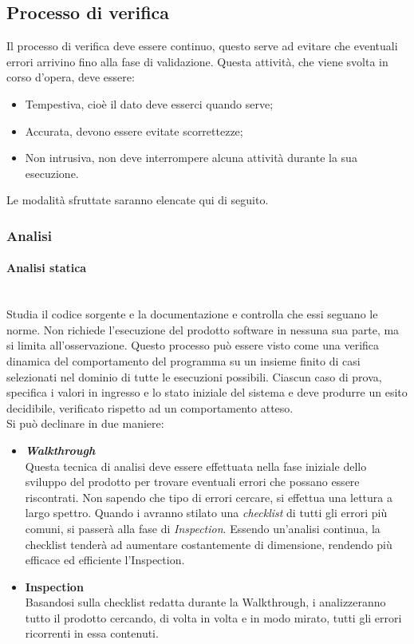\subsection{Processo di verifica}
Il processo di verifica deve essere continuo, questo serve ad evitare che eventuali errori arrivino fino alla fase di validazione.
Questa attività, che viene svolta in corso d'opera, deve essere:
\begin{itemize}
	\item Tempestiva, cioè il dato deve esserci quando serve;
	\item Accurata, devono essere evitate scorrettezze;
	\item Non intrusiva, non deve interrompere alcuna attività durante la sua esecuzione.
\end{itemize}
Le modalità sfruttate saranno elencate qui di seguito.
	\subsubsection{Analisi}
	\paragraph{Analisi statica}
	~\\Studia il codice sorgente e la documentazione e controlla che essi seguano le norme. Non richiede l'esecuzione del prodotto software in nessuna sua parte, ma si limita all'osservazione. Questo processo può essere visto come una verifica dinamica del comportamento del programma su un insieme finito di casi selezionati nel dominio di tutte le esecuzioni possibili. Ciascun caso di prova, specifica i valori in ingresso e lo stato iniziale del sistema e deve produrre un esito decidibile, verificato rispetto ad un comportamento atteso. 
	\\Si può declinare in due maniere:
	\begin{itemize}
		\item \textbf{\emph{Walkthrough}}
		~\\Questa tecnica di analisi deve essere effettuata nella fase iniziale dello sviluppo del prodotto per trovare eventuali errori che possano essere riscontrati. Non sapendo che tipo di errori cercare, si effettua una lettura a largo spettro. Quando i \vers{} avranno stilato una \emph{checklist} di tutti gli errori più comuni, si passerà alla fase di \emph{Inspection}. Essendo un'analisi continua, la checklist tenderà ad aumentare costantemente di dimensione, rendendo più efficace ed efficiente l'Inspection.
		\item \textbf{Inspection}
		~\\Basandosi sulla checklist redatta durante la Walkthrough, i \vers{} analizzeranno tutto il prodotto cercando, di volta in volta e in modo mirato, tutti gli errori ricorrenti in essa contenuti.
	\end{itemize}
